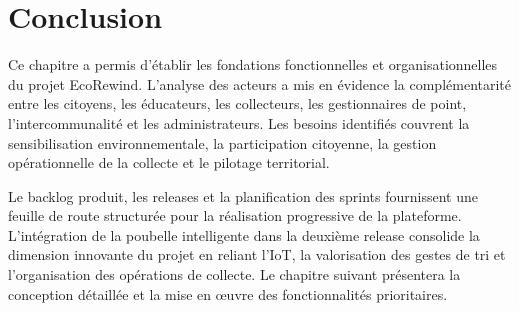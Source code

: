 \section{Conclusion}
\label{sec:conclusion}

Ce chapitre a permis d'établir les fondations fonctionnelles et organisationnelles du projet EcoRewind. L'analyse des acteurs a mis en évidence la complémentarité entre les citoyens, les éducateurs, les collecteurs, les gestionnaires de point, l'intercommunalité et les administrateurs. Les besoins identifiés couvrent la sensibilisation environnementale, la participation citoyenne, la gestion opérationnelle de la collecte et le pilotage territorial.

Le backlog produit, les releases et la planification des sprints fournissent une feuille de route structurée pour la réalisation progressive de la plateforme. L'intégration de la poubelle intelligente dans la deuxième release consolide la dimension innovante du projet en reliant l'IoT, la valorisation des gestes de tri et l'organisation des opérations de collecte. Le chapitre suivant présentera la conception détaillée et la mise en œuvre des fonctionnalités prioritaires.
